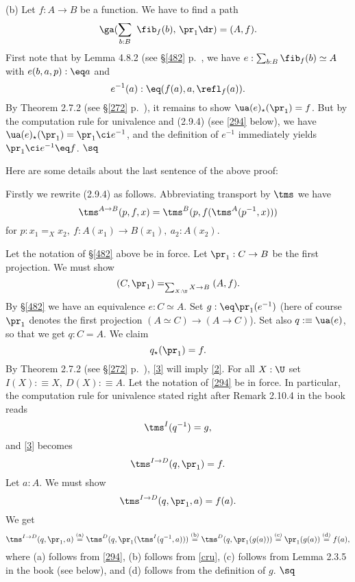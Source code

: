 \documentclass[12pt]{article}
\begin{document}
\nn(b) Let $f:A\to B$ be a function. We have to find a path
$$
\ga(\sum_{b:B}\ \fib_f(b),\,\pr_1\dr)=(A,f).
$$ 
First note that by Lemma 4.8.2 (see \S\ref{482} p.~\pageref{482}, we have $e:\sum_{b:B}\fib_f(b)\simeq A$ with $e(b,a,p):\eq a$ and $$e^{-1}(a):\eq(f(a),a,\refl_f(a)).$$ By Theorem 2.7.2 (see \S\ref{272} p.~\pageref{272}), it remains to show $\ua(e)_\star(\pr_1)=f$. But by the computation rule for univalence and (2.9.4) (see \eqref{294} below), we have $\ua(e)_\star(\pr_1)=\pr_1\ci e^{-1}$, and the definition of $e^{-1}$ immediately yields $\pr_1\ci e^{-1}\eq f$. $\sq$

Here are some details about the last sentence of the above proof: 

Firstly we rewrite (2.9.4) as follows. Abbreviating transport by $\tms$ we have 
\begin{equation}\label{294}
\tms^{A\to B}(p,f,x)=\tms^B(p,f(\tms^A(p^{-1},x)))
\end{equation}
for $p:x_1=_Xx_2,\ f:A(x_1)\to B(x_1),\ a_2:A(x_2)$. 

Let the notation of \S\ref{482} above be in force. Let $\pr_1:C\to B$ be the first projection. We must show 
\begin{equation}\label{2}
(C,\pr_1)=_{\sum_{X:\U}X\to B}(A,f).
\end{equation} 
By \S\ref{482} we have an equivalence $e:C\simeq A$. Set $g:\eq\pr_1(e^{-1})$ (here of course $\pr_1$ denotes the first projection $(A\simeq C)\to(A\to C)$). Set also $q:\equiv\ua(e)$, so that we get $q:C=A$. We claim 
\begin{equation}\label{3}
q_\star(\pr_1)=f.
\end{equation} 
By Theorem 2.7.2 (see \S\ref{272} p.~\pageref{272}), \eqref{3} will imply \eqref{2}. For all $X:\U$ set $I(X):\equiv X,\ D(X):\equiv A$. Let the notation of \eqref{294} be in force. In particular, the computation rule for univalence stated right after Remark 2.10.4 in the book reads 
\begin{equation}\label{cru}
\tms^I(q^{-1})=g,
\end{equation}
and \eqref{3} becomes 
$$
\tms^{I\to D}(q,\pr_1)=f.
$$ 
Let $a:A$. We must show 
$$
\tms^{I\to D}(q,\pr_1,a)=f(a).
$$ 
We get 
$$
\tms^{I\to D}(q,\pr_1,a)\overset{\text{(a)}}=\tms^D(q,\pr_1(\tms^I(q^{-1},a)))\overset{\text{(b)}}=\tms^D(q,\pr_1(g(a)))\overset{\text{(c)}}=\pr_1(g(a))\overset{\text{(d)}}=f(a),
$$ 
where (a) follows from \eqref{294}, (b) follows from \eqref{cru}, (c) follows from Lemma 2.3.5 in the book (see below), and (d) follows from the definition of $g$. $\sq$
\end{document}

